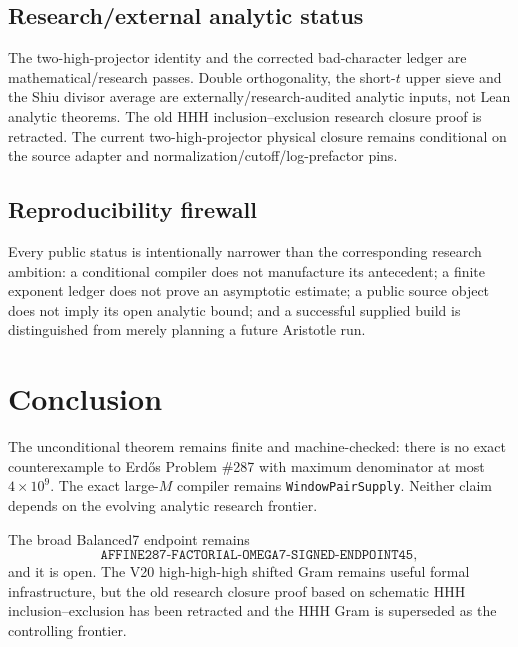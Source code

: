 \documentclass[11pt]{article}
\theoremstyle{definition}
\newcommand{\1}{\mathbf 1}
\begin{document}
\subsection{Research/external analytic status}

The two-high-projector identity and the corrected bad-character ledger are
mathematical/research passes.  Double orthogonality, the short-$t$ upper sieve and the Shiu
divisor average are externally/research-audited analytic inputs, not Lean analytic
theorems.  The old HHH inclusion--exclusion research closure proof is retracted.  The
current two-high-projector physical closure remains conditional on the source adapter and
normalization/cutoff/log-prefactor pins.

\subsection{Reproducibility firewall}

Every public status is intentionally narrower than the corresponding research ambition:
a conditional compiler does not manufacture its antecedent; a finite exponent ledger does
not prove an asymptotic estimate; a public source object does not imply its open analytic
bound; and a successful supplied build is distinguished from merely planning a future
Aristotle run.


\section{Conclusion}

The unconditional theorem remains finite and machine-checked: there is no exact
counterexample to Erd\H{o}s Problem \#287 with maximum denominator at most
$4\times10^9$.  The exact large-$M$ compiler remains \texttt{WindowPairSupply}.  Neither
claim depends on the evolving analytic research frontier.

The broad Balanced7 endpoint remains
\[
\texttt{AFFINE287-FACTORIAL-OMEGA7-SIGNED-ENDPOINT45},
\]
and it is open.  The V20 high-high-high shifted Gram remains useful formal infrastructure,
but the old research closure proof based on schematic HHH inclusion--exclusion has been
retracted and the HHH Gram is superseded as the controlling frontier.
\end{document}
